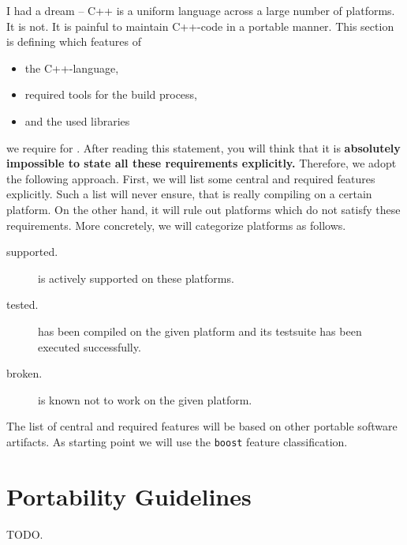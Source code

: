 I had a dream -- C++ is a uniform language across a large number of
platforms. It is not. It is painful to maintain C++-code in a portable
manner. This section is defining which features of 
\begin{itemize}
\item the C++-language,
\item required tools for the build process,
\item and the used libraries 
\end{itemize}
we require for \SYNEIGHT. After reading this statement, you will think
that it is \textbf{absolutely impossible to state all these
  requirements explicitly.} 
%
Therefore, we adopt the following approach. First, we will list some
central and required features explicitly. Such a list will never
ensure, that \SYNEIGHT is really compiling on a certain platform. On the
other hand, it will rule out platforms which do not satisfy these
requirements.
%
More concretely, we will categorize platforms as follows.
\begin{description}
\item[supported.] \SYNEIGHT is actively supported on these platforms. 
\item[tested.] \SYNEIGHT has been compiled on the given platform and
  its testsuite has been executed successfully. 
\item[broken.] \SYNEIGHT is known not to work on the given platform.
\end{description}

The list of central and required features will be based on other
portable software artifacts. As starting point we will use the
\texttt{boost} feature classification.


\section{Portability Guidelines}
\label{sec:portability-guidelines}

TODO.


